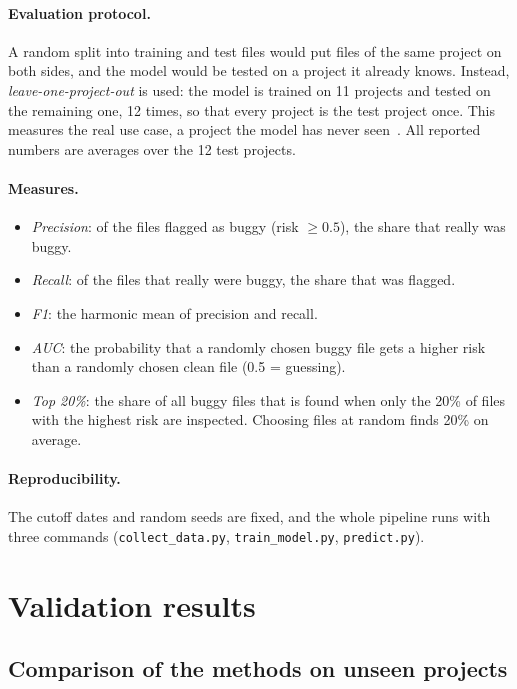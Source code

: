 \documentclass[11pt,a4paper]{article}
\begin{document}
\paragraph{Evaluation protocol.} A random split into training and test files
would put files of the same project on both sides, and the model would be
tested on a project it already knows. Instead, \emph{leave-one-project-out}
is used: the model is trained on 11 projects and tested on the remaining one,
12 times, so that every project is the test project once. This measures the
real use case, a project the model has never seen~\cite{zimmermann}. All
reported numbers are averages over the 12 test projects.

\paragraph{Measures.}
\begin{itemize}
\item \emph{Precision}: of the files flagged as buggy (risk $\geq 0.5$), the
      share that really was buggy.
\item \emph{Recall}: of the files that really were buggy, the share that was
      flagged.
\item \emph{F1}: the harmonic mean of precision and recall.
\item \emph{AUC}: the probability that a randomly chosen buggy file gets a
      higher risk than a randomly chosen clean file (0.5 = guessing).
\item \emph{Top 20\%}: the share of all buggy files that is found when only
      the 20\% of files with the highest risk are inspected. Choosing files at
      random finds 20\% on average.
\end{itemize}

\paragraph{Reproducibility.} The cutoff dates and random seeds are fixed, and
the whole pipeline runs with three commands (\texttt{collect\_data.py},
\texttt{train\_model.py}, \texttt{predict.py}).

\section{Validation results}
\label{sec:results}

\subsection{Comparison of the methods on unseen projects}
\end{document}
